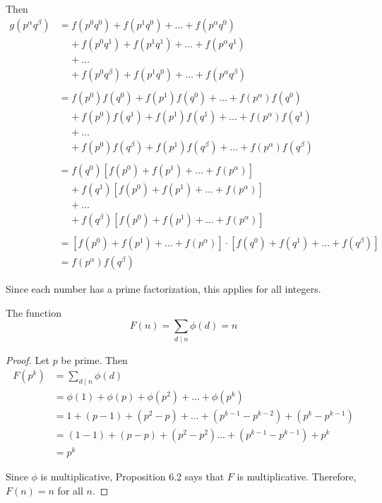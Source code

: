     Then
    \begin{align*}
    g(p^\alpha q^\beta) 
        &= f(p^0 q^0) + f(p^1 q^0) + \dots + f(p^\alpha q^0) \\
        & \;\;\;\; + f(p^0 q^1) + f(p^1 q^1) + \dots + f(p^\alpha q^1) \\
        & \;\;\;\; + \dots \\
        & \;\;\;\; + f(p^0 q^\beta) + f(p^1 q^0) + \ldots + f(p^\alpha q^\beta) \\
        \\    
        &= f(p^0)f(q^0) + f(p^1)f(q^0) + \dots + f(p^\alpha)f(q^0) \\
        & \;\;\;\; + f(p^0)f(q^1) + f(p^1)f(q^1) + \dots + f(p^\alpha)f(q^1) \\
        & \;\;\;\; + \dots \\
        & \;\;\;\; + f(p^0)f(q^\beta) + f(p^1)f(q^\beta) + \dots + f(p^\alpha)f(q^\beta) \\
        \\
        &= f(q^0)[f(p^0) + f(p^1) + \ldots + f(p^\alpha)] \\
        & \;\;\;\; + f(q^1)[f(p^0) + f(p^1) + \ldots + f(p^\alpha)] \\
        & \;\;\;\; + \ldots \\
        & \;\;\;\; + f(q^\beta)[f(p^0) + f(p^1) + \ldots + f(p^\alpha)] \\
        \\
        &= [f(p^0) + f(p^1) + \ldots + f(p^\alpha)] \cdot [f(q^0) + f(q^1) + \ldots + f(q^\beta)] \\
        &= f(p^\alpha)f(q^\beta)
    \end{align*}
    
    Since each number has a prime factorization, this applies for all integers.
\begin{prop}[part b]
    The function
    \[ F(n) = \sum_{d \mid n} \phi(d) = n \]
\end{prop}
\begin{proof}
    Let $p$ be prime. Then
    \begin{align*}
    F(p^k) &= \sum_{d \mid n} \phi(d) \\
           &= \phi(1) + \phi(p) + \phi(p^2) + \ldots + \phi(p^k) \\
           &= 1 + (p-1) + (p^2 - p) + \ldots + (p^{k-1} - p^{k-2}) + (p^k - p^{k-1}) \\
           &= (1-1) + (p-p) + (p^2 - p^2) \ldots + (p^{k-1} - p^{k-1}) + p^k \\
           &= p^k
    \end{align*}    

    Since $\phi$ is multiplicative, Proposition 6.2 says that $F$ is
    multiplicative. Therefore, $F(n) = n$ for all $n$.
\end{proof}
